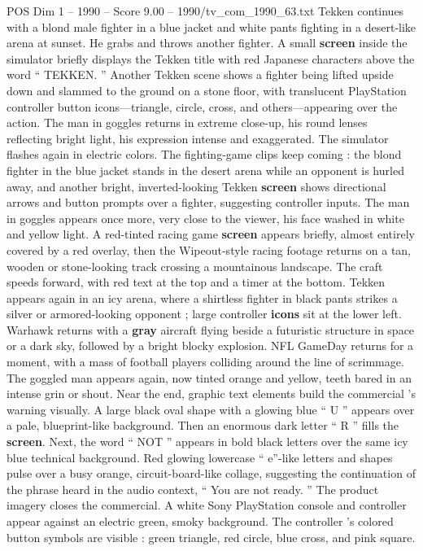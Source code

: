 \begin{textsample}{POS Dim 1 – 1990 – Score 9.00 – 1990/tv\_com\_1990\_63.txt}
Tekken continues with a blond male fighter in a blue jacket and white pants fighting in a desert-like arena at sunset.
He grabs and throws another fighter.
A small \textbf{screen} inside the simulator briefly displays the Tekken title with red Japanese characters above the word “ TEKKEN. ” Another Tekken scene shows a fighter being lifted upside down and slammed to the ground on a stone floor, with translucent PlayStation controller button icons—triangle, circle, cross, and others—appearing over the action.
The man in goggles returns in extreme close-up, his round lenses reflecting bright light, his expression intense and exaggerated.
The simulator flashes again in electric colors.
The fighting-game clips keep coming : the blond fighter in the blue jacket stands in the desert arena while an opponent is hurled away, and another bright, inverted-looking Tekken \textbf{screen} shows directional arrows and button prompts over a fighter, suggesting controller inputs.
The man in goggles appears once more, very close to the viewer, his face washed in white and yellow light.
A red-tinted racing game \textbf{screen} appears briefly, almost entirely covered by a red overlay, then the Wipeout-style racing footage returns on a tan, wooden or stone-looking track crossing a mountainous landscape.
The craft speeds forward, with red text at the top and a timer at the bottom.
Tekken appears again in an icy arena, where a shirtless fighter in black pants strikes a silver or armored-looking opponent ; large controller \textbf{icons} sit at the lower left.
Warhawk returns with a \textbf{gray} aircraft flying beside a futuristic structure in space or a dark sky, followed by a bright blocky explosion.
NFL GameDay returns for a moment, with a mass of football players colliding around the line of scrimmage.
The goggled man appears again, now tinted orange and yellow, teeth bared in an intense grin or shout.
Near the end, graphic text elements build the commercial ’s warning visually.
A large black oval shape with a glowing blue “ U ” appears over a pale, blueprint-like background.
Then an enormous dark letter “ R ” fills the \textbf{screen}.
Next, the word “ NOT ” appears in bold black letters over the same icy blue technical background.
Red glowing lowercase “ e”-like letters and shapes pulse over a busy orange, circuit-board-like collage, suggesting the continuation of the phrase heard in the audio context, “ You are not ready. ” The product imagery closes the commercial.
A white Sony PlayStation console and controller appear against an electric green, smoky background.
The controller ’s colored button symbols are visible : green triangle, red circle, blue cross, and pink square.

\end{textsample}
